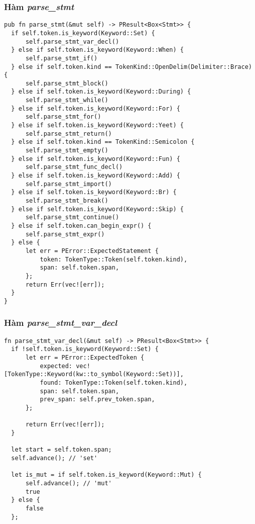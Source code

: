 {\subsubsection{Hàm \textit{parse\_stmt}}
\label{ap1:stmt}
\begin{lstlisting}
pub fn parse_stmt(&mut self) -> PResult<Box<Stmt>> {
  if self.token.is_keyword(Keyword::Set) {
      self.parse_stmt_var_decl()
  } else if self.token.is_keyword(Keyword::When) {
      self.parse_stmt_if()
  } else if self.token.kind == TokenKind::OpenDelim(Delimiter::Brace) {
      self.parse_stmt_block()
  } else if self.token.is_keyword(Keyword::During) {
      self.parse_stmt_while()
  } else if self.token.is_keyword(Keyword::For) {
      self.parse_stmt_for()
  } else if self.token.is_keyword(Keyword::Yeet) {
      self.parse_stmt_return()
  } else if self.token.kind == TokenKind::Semicolon {
      self.parse_stmt_empty()
  } else if self.token.is_keyword(Keyword::Fun) {
      self.parse_stmt_func_decl()
  } else if self.token.is_keyword(Keyword::Add) {
      self.parse_stmt_import()
  } else if self.token.is_keyword(Keyword::Br) {
      self.parse_stmt_break()
  } else if self.token.is_keyword(Keyword::Skip) {
      self.parse_stmt_continue()
  } else if self.token.can_begin_expr() {
      self.parse_stmt_expr()
  } else {
      let err = PError::ExpectedStatement {
          token: TokenType::Token(self.token.kind),
          span: self.token.span,
      };
      return Err(vec![err]);
  }
}
\end{lstlisting}

\subsubsection{Hàm \textit{parse\_stmt\_var\_decl}}
\label{ap1:stmt_decl_var}
\begin{lstlisting}
fn parse_stmt_var_decl(&mut self) -> PResult<Box<Stmt>> {
  if !self.token.is_keyword(Keyword::Set) {
      let err = PError::ExpectedToken {
          expected: vec![TokenType::Keyword(kw::to_symbol(Keyword::Set))],
          found: TokenType::Token(self.token.kind),
          span: self.token.span,
          prev_span: self.prev_token.span,
      };

      return Err(vec![err]);
  }

  let start = self.token.span;
  self.advance(); // 'set'

  let is_mut = if self.token.is_keyword(Keyword::Mut) {
      self.advance(); // 'mut'
      true
  } else {
      false
  };


\end{lstlisting}}
